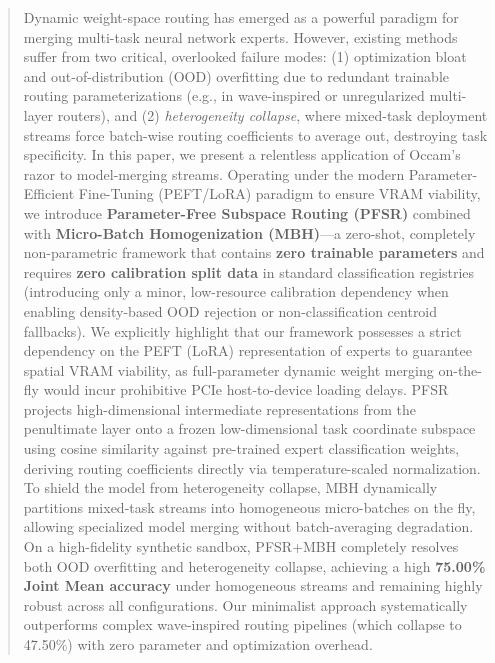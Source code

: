 \begin{abstract}
Dynamic weight-space routing has emerged as a powerful paradigm for merging multi-task neural network experts. However, existing methods suffer from two critical, overlooked failure modes: (1) optimization bloat and out-of-distribution (OOD) overfitting due to redundant trainable routing parameterizations (e.g., in wave-inspired or unregularized multi-layer routers), and (2) \emph{heterogeneity collapse}, where mixed-task deployment streams force batch-wise routing coefficients to average out, destroying task specificity. 
In this paper, we present a relentless application of Occam's razor to model-merging streams. Operating under the modern Parameter-Efficient Fine-Tuning (PEFT/LoRA) paradigm to ensure VRAM viability, we introduce \textbf{Parameter-Free Subspace Routing (PFSR)} combined with \textbf{Micro-Batch Homogenization (MBH)}---a zero-shot, completely non-parametric framework that contains \textbf{zero trainable parameters} and requires \textbf{zero calibration split data} in standard classification registries (introducing only a minor, low-resource calibration dependency when enabling density-based OOD rejection or non-classification centroid fallbacks). We explicitly highlight that our framework possesses a strict dependency on the PEFT (LoRA) representation of experts to guarantee spatial VRAM viability, as full-parameter dynamic weight merging on-the-fly would incur prohibitive PCIe host-to-device loading delays. 
PFSR projects high-dimensional intermediate representations from the penultimate layer onto a frozen low-dimensional task coordinate subspace using cosine similarity against pre-trained expert classification weights, deriving routing coefficients directly via temperature-scaled normalization. To shield the model from heterogeneity collapse, MBH dynamically partitions mixed-task streams into homogeneous micro-batches on the fly, allowing specialized model merging without batch-averaging degradation. 
On a high-fidelity synthetic sandbox, PFSR+MBH completely resolves both OOD overfitting and heterogeneity collapse, achieving a high \textbf{75.00\% Joint Mean accuracy} under homogeneous streams and remaining highly robust across all configurations. Our minimalist approach systematically outperforms complex wave-inspired routing pipelines (which collapse to 47.50\%) with zero parameter and optimization overhead.
\end{abstract}
